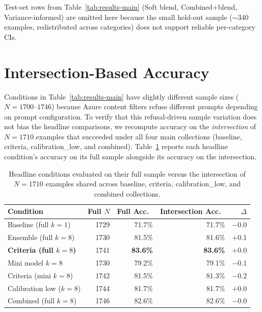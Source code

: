 \documentclass{article}
\begin{document}
Test-set rows from Table~\ref{tab:results-main} (Soft blend, Combined+blend, Variance-informed) are omitted here because the small held-out sample (${\sim}$340 examples, redistributed across categories) does not support reliable per-category CIs.

\section{Intersection-Based Accuracy}
\label{sec:intersection}

Conditions in Table~\ref{tab:results-main} have slightly different sample sizes ($N{=}1700$--$1746$) because Azure content filters refuse different prompts depending on prompt configuration. To verify that this refusal-driven sample variation does not bias the headline comparisons, we recompute accuracy on the \emph{intersection} of $N{=}1710$ examples that succeeded under all four main collections (baseline, criteria, calibration\_low, and combined). Table~\ref{tab:intersection} reports each headline condition's accuracy on its full sample alongside its accuracy on the intersection.

\begin{table}[ht]
\centering
\caption{Headline conditions evaluated on their full sample versus the intersection of $N{=}1710$ examples shared across baseline, criteria, calibration\_low, and combined collections.}
\label{tab:intersection}
\footnotesize
\begin{tabular}{lrrrr}
\toprule
Condition & Full $N$ & Full Acc.\ & Intersection Acc.\ & $\Delta$ \\
\midrule
Baseline (full $k{=}1$)         & 1729 & 71.7\% & 71.7\% & $-$0.0 \\
Ensemble (full $k{=}8$)         & 1730 & 81.5\% & 81.6\% & $+$0.1 \\
\textbf{Criteria (full $k{=}8$)} & 1741 & \textbf{83.6\%} & \textbf{83.6\%} & $+$0.0 \\
Mini model $k{=}8$              & 1730 & 79.2\% & 79.1\% & $-$0.1 \\
Criteria (mini $k{=}8$)         & 1742 & 81.5\% & 81.3\% & $-$0.2 \\
Calibration low ($k{=}8$)             & 1744 & 81.7\% & 81.7\% & $+$0.0 \\
Combined (full $k{=}8$)         & 1746 & 82.6\% & 82.6\% & $-$0.0 \\
\bottomrule
\end{tabular}
\end{table}
\end{document}
